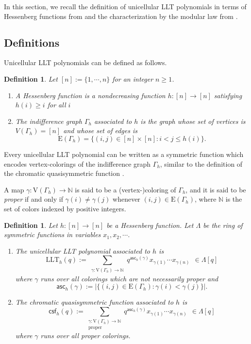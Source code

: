 \documentclass[11pt]{article}
\newtheorem{definition}[theo]{Definition}
\theoremstyle{definition}
\numberwithin{equation}{section}
\numberwithin{equation}{section}
\newcommand\beq{\begin{equation}}
\newcommand\eeq{\end{equation}}
\newcommand\E{\mathrm{E}}
\newcommand\V{\mathrm{V}}
\newcommand\G{\Gamma}
\newcommand\csf{\mathsf{csf}}
\newcommand\asc{\mathsf{asc}}
\newcommand\LLT{\mathrm{LLT}}
\newcommand{\N}{\mathbb{N}}
\begin{document}
In this section, we recall the definition of unicellular LLT polynomials in terms of Hessenberg functions from \cite{CM} and the characterization by the modular law from \cite{AN2}. 
\subsection{Definitions}\label{n1}
Unicellular LLT polynomials can be defined as follows. 
\begin{definition}
	Let $[n]:=\{1,\cdots, n\}$ for an integer $n\geq1$.
	\begin{enumerate}
		\item A \emph{Hessenberg function} is a nondecreasing function $h:[n]\to[n]$ satisfying $h(i)\geq i $ for all $i$
		\item The  \emph{indifference graph} $\G_h$ associated to $h$ is the graph whose  set of vertices is $V(\G_h)=[n]$ and whose set of edges is
			\[\E(\G_h)=\{(i,j)\in [n]\times [n]:i<j\leq h(i)\}.\]
	\end{enumerate}
\end{definition}

Every unicellular LLT polynomial can be written as a symmetric function which encodes vertex-colorings of the indifference graph $\G_h$, similar to the definition of the chromatic quasisymmetric function \cite{Sta,SW}.

A map $\gamma:\V(\G_h)\to \N$ is said to be a (vertex-)coloring of $\G_h$, and it is said to be \emph{proper} if and only if $\gamma(i)\neq \gamma(j)$ whenever $(i,j)\in \E(\G_h)$, where $\N$ is the set of colors indexed by  positive integers.

\begin{definition}\label{n2} \cite{CM, Sta, SW}
	Let $h:[n]\to [n]$ be a Hessenberg function. Let $\Lambda$ be the ring of symmetric functions in variables  $x_1,x_2,\cdots$.

	\begin{enumerate}
	\item The \emph{unicellular LLT polynomial} associated to $h$ is 
	\beq\label{n12}
	\LLT_h(q):=\sum_{\substack{\gamma:\V(\G_h)\to \N }}q^{\asc_h(\gamma)}x_{\gamma(1)}\cdots x_{\gamma(n)} \ \ \in \Lambda[q]\eeq
	where $\gamma$ runs over all colorings which are not necessarily proper and 
	\[\asc_h(\gamma):=\lvert\{(i,j)\in \E(\G_h):\gamma(i)<\gamma(j)\}\rvert.\]
	\item  The \emph{chromatic quasisymmetric function} associated to $h$ is 
	\beq\label{n11} 
	\csf_h(q):=\sum_{\substack{\gamma:\V(\G_h)\to \N \\ \text{proper}}}q^{\asc_h(\gamma)}x_{\gamma(1)}\cdots x_{\gamma(n)}\ \ \in \Lambda[q]\eeq
	where $\gamma$ runs over all \emph{proper} colorings.
	\end{enumerate}
\end{definition} 
\end{document}
